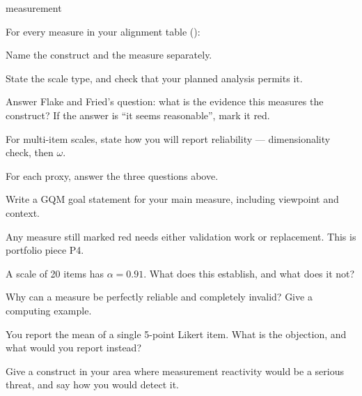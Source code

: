 \begin{traditions}{measurement}
\end{traditions}

\begin{lab}
For every measure in your alignment table ():

\begin{tightnum}
  \item Name the construct and the measure separately.
  \item State the scale type, and check that your planned analysis permits it.
  \item Answer Flake and Fried's question: what is the evidence this measures
    the construct? If the answer is ``it seems reasonable'', mark it red.
  \item For multi-item scales, state how you will report reliability ---
    dimensionality check, then $\omega$.
  \item For each proxy, answer the three questions above.
  \item Write a GQM goal statement for your main measure, including viewpoint
    and context.
\end{tightnum}

\medskip
Any measure still marked red needs either validation work or replacement. This
is portfolio piece P4.
\end{lab}

\begin{checkpoint}
\begin{tightnum}
  \item A scale of 20 items has $\alpha = 0.91$. What does this establish, and
    what does it not?
  \item Why can a measure be perfectly reliable and completely invalid? Give a
    computing example.
  \item You report the mean of a single 5-point Likert item. What is the
    objection, and what would you report instead?
  \item Give a construct in your area where measurement reactivity would be a
    serious threat, and say how you would detect it.
\end{tightnum}
\end{checkpoint}

